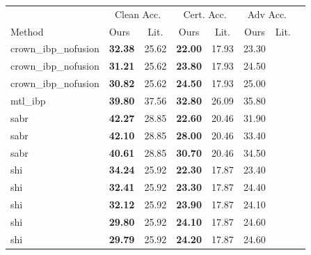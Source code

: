 \begin{tabular}{llcccccc}
\toprule
 & \multicolumn{2}{c}{Clean Acc.} & \multicolumn{2}{c}{Cert. Acc.} & \multicolumn{2}{c}{Adv Acc.} \\
Method & Ours & Lit. & Ours & Lit. & Ours & Lit. \\
\midrule
crown\_ibp\_nofusion & \textbf{32.38} & 25.62 & \textbf{22.00} & 17.93 & 23.30 & \\
crown\_ibp\_nofusion & \textbf{31.21} & 25.62 & \textbf{23.80} & 17.93 & 24.50 & \\
crown\_ibp\_nofusion & \textbf{30.82} & 25.62 & \textbf{24.50} & 17.93 & 25.00 & \\
mtl\_ibp & \textbf{39.80} & 37.56 & \textbf{32.80} & 26.09 & 35.80 & \\
sabr & \textbf{42.27} & 28.85 & \textbf{22.60} & 20.46 & 31.90 & \\
sabr & \textbf{42.10} & 28.85 & \textbf{28.00} & 20.46 & 33.40 & \\
sabr & \textbf{40.61} & 28.85 & \textbf{30.70} & 20.46 & 34.50 & \\
shi & \textbf{34.24} & 25.92 & \textbf{22.30} & 17.87 & 23.40 & \\
shi & \textbf{32.41} & 25.92 & \textbf{23.30} & 17.87 & 24.40 & \\
shi & \textbf{32.12} & 25.92 & \textbf{23.90} & 17.87 & 24.10 & \\
shi & \textbf{29.80} & 25.92 & \textbf{24.10} & 17.87 & 24.60 & \\
shi & \textbf{29.79} & 25.92 & \textbf{24.20} & 17.87 & 24.60 & \\
\bottomrule
\end{tabular}